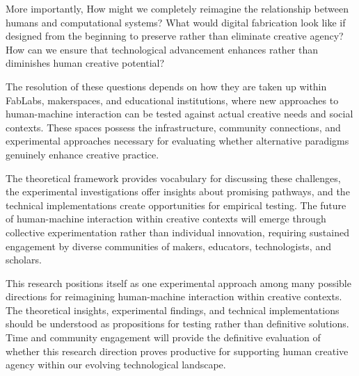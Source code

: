 \vspace{0.5cm}

More importantly, How might we completely reimagine the relationship between humans and computational systems? What would digital fabrication look like if designed from the beginning to preserve rather than eliminate creative agency? How can we ensure that technological advancement enhances rather than diminishes human creative potential?

\vspace{0.5cm}

The resolution of these questions depends on how they are taken up within FabLabs, makerspaces, and educational institutions, where new approaches to human-machine interaction can be tested against actual creative needs and social contexts. These spaces possess the infrastructure, community connections, and experimental approaches necessary for evaluating whether alternative paradigms genuinely enhance creative practice.

\vspace{0.5cm}

The theoretical framework provides vocabulary for discussing these challenges, the experimental investigations offer insights about promising pathways, and the technical implementations create opportunities for empirical testing. The future of human-machine interaction within creative contexts will emerge through collective experimentation rather than individual innovation, requiring sustained engagement by diverse communities of makers, educators, technologists, and scholars.

\vspace{0.5cm}

This research positions itself as one experimental approach among many possible directions for reimagining human-machine interaction within creative contexts. The theoretical insights, experimental findings, and technical implementations should be understood as propositions for testing rather than definitive solutions. Time and community engagement will provide the definitive evaluation of whether this research direction proves productive for supporting human creative agency within our evolving technological landscape.